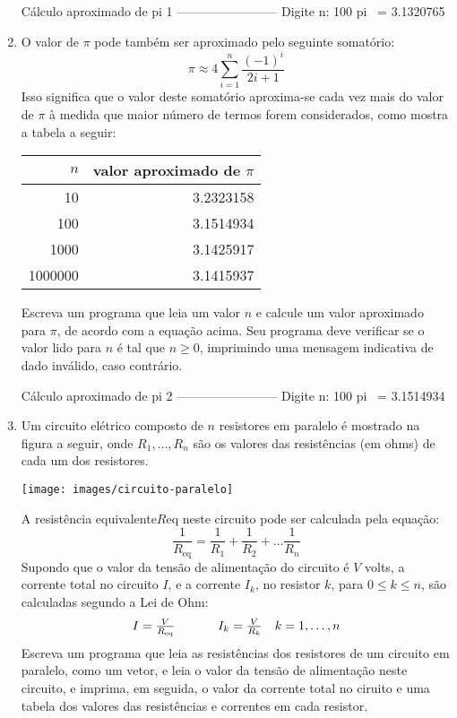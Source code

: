 \documentclass[11pt,fleqn]{practice}
\begin{document}
\begin{enumerate}
  \begin{runexample}
Cálculo aproximado de pi 1
------------------------
Digite n: 100
pi  ~=  3.1320765 
\end{runexample}

\item O valor de $\pi$ pode também ser aproximado pelo seguinte somatório: 
\[  \pi \approx 4 \sum_{i=1}^n \frac{(-1)^i}{2i+1} \]
Isso significa que o valor deste somatório aproxima-se cada vez mais do valor de $\pi$ à medida que maior número de termos forem considerados, como mostra a tabela a seguir:

\begin{center}
\begin{tabular}{rr}
	$n$ & valor aproximado de $\pi$ \\\hline
          10  & 3.2323158 \\
         100 & 3.1514934 \\
       1000 & 3.1425917 \\
 1000000 & 3.1415937 \\\hline
\end{tabular}
\end{center}

Escreva um programa que leia um valor $n$ e calcule um valor aproximado para $\pi$, de acordo com a equação acima. Seu programa deve verificar se o valor lido para $n$ é tal que $n \geq 0$, imprimindo uma mensagem indicativa de dado inválido, caso contrário. 

  \begin{runexample}
Cálculo aproximado de pi 2
------------------------
Digite n: 100
pi  ~=  3.1514934
\end{runexample}

\item Um circuito elétrico composto de $n$ resistores em paralelo é mostrado na figura a seguir, onde $R_1, \ldots, R_n$ são os valores das resistências (em ohms) de cada um dos resistores. 
   \begin{center}
     \texttt{[image: images/circuito-paralelo]}
   \end{center}
A resistência equivalente$R\text{eq}$ neste circuito pode ser calculada pela equação:
\[ \frac{1}{R_\text{eq}} = \frac{1}{R_1} + \frac{1}{R_2} + \ldots \frac{1}{R_n} \]
Supondo que o valor da tensão de alimentação do circuito é $V$ volts, a corrente total no circuito $I$, e a  corrente $I_k$, no resistor $k$, para $0\leq k \leq n$, são calculadas segundo a Lei de Ohm:
 \[ \begin{array}{lcll} 
     I = \frac{V}{R_\text{eq}}  & \hspace*{.5cm} & I_ k = \frac{V}{R_k} & k=1,\ldots,n 
    \end{array}
\] 
Escreva um programa que leia as resistências dos resistores de um circuito em paralelo, como um vetor, e leia o valor da tensão de alimentação neste circuito, e imprima, em seguida, o valor da corrente total no ciruito e uma tabela dos valores das resistências e correntes em cada resistor. 
 

\end{enumerate}
\end{document}
